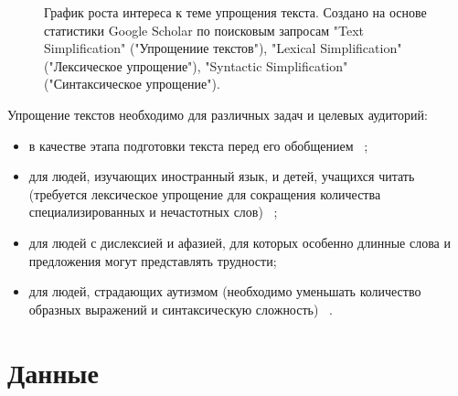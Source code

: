 \clearpage
\begin{figure}[h!]
	
	
	\caption{График роста интереса к теме упрощения текста. Создано на основе статистики Google Scholar по поисковым запросам "Text Simplification" ("Упрощениие текстов"),  "Lexical Simplification" ("Лексическое упрощение"), "Syntactic Simplification" ("Синтаксическое упрощение")\cite{sikka_survey_2020}.}
	
	\label{fig:growth_of_interest}
	
\end{figure}

Упрощение текстов необходимо для различных задач и целевых аудиторий: 
\begin{itemize}
	\item в качестве этапа подготовки текста перед его обобщением ~\cite{finegan_dollak_sentence_2016}; 
	\item для людей, изучающих иностранный язык, и детей, учащихся читать (требуется лексическое упрощение для сокращения количества специализированных и нечастотных слов) ~\cite{liu_simplification_2016};
	\item для людей с дислексией и афазией, для которых особенно длинные слова и предложения могут представлять трудности;
	\item для людей, страдающих аутизмом (необходимо уменьшать количество образных выражений и синтаксическую сложность) ~\cite{evans_evaluation_2014}.
\end{itemize}

\section{Данные}

